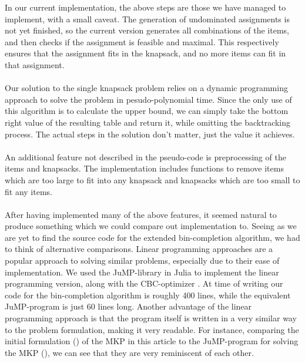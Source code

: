 \documentclass[b5paper]{article}
\begin{document}
In our current implementation, the above steps are those we have managed to implement, with a small caveat. 
The generation of undominated assignments is not yet finished, so the current version generates all combinations of the items,
and then checks if the assignment is feasible and maximal. This respectively ensures that the assignment fits in the knapsack, and no more items can fit in that assignment.
\\ \\
Our solution to the single knapsack problem relies on a dynamic programming approach to solve the problem in pesudo-polynomial time.
Since the only use of this algorithm is to calculate the upper bound, we can simply take the bottom right value of the resulting table and return it, 
while omitting the backtracking process. The actual steps in the solution don't matter, just the value it achieves. 
\\ \\
An additional feature not described in the pseudo-code is preprocessing of the items and knapsacks.
The implementation includes functions to remove items which are too large to fit into any knapsack and knapsacks which are too small to fit any items. 
\\ \\
After having implemented many of the above features, it seemed natural to produce something which we could compare out implementation to.
Seeing as we are yet to find the source code for the extended bin-completion algorithm, we had to think of alternative comparisons.
Linear programming approaches are a popular approach to solving similar problems, especially due to their ease of implementation.
We used the JuMP-library in Julia to implement the linear programming version, along with the CBC-optimizer \cite{dunning_jump_2017}.
At time of writing our code for the bin-completion algorithm is roughly 400 lines, while the equivalent JuMP-program is just 60 lines long.
Another advantage of the linear programming approach is that the program itself is written in a very similar way to the problem formulation, making it very readable.
For instance, comparing the initial formulation (\pageref{problem_formulation}) of the MKP in this article to the JuMP-program for solving the MKP (\pageref{alg:cap}), we can see that they are very reminiscent of each other.
\end{document}
